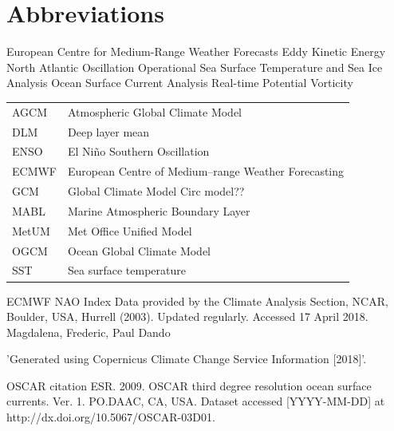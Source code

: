 


\section{Abbreviations}

\begin{acronyms}
	European Centre for Medium-Range Weather Forecasts
	Eddy Kinetic Energy
	North Atlantic Oscillation
	Operational Sea Surface Temperature and Sea Ice Analysis
	Ocean Surface Current Analysis Real-time
	Potential Vorticity
\end{acronyms}

\begin{tabular}{ l l }
	AGCM & Atmospheric Global Climate Model \\
	DLM & Deep layer mean \\ 
	ENSO & El Ni\~{n}o Southern Oscillation \\ 
	ECMWF & European Centre of Medium--range Weather Forecasting \\
	
	GCM & Global Climate Model Circ model?? \\
	MABL & Marine Atmospheric Boundary Layer \\
	MetUM & Met Office Unified Model \\
	OGCM & Ocean Global Climate Model \\
	SST & Sea surface temperature \\
	
	
\end{tabular}


\newpage





\acknowledgments
ECMWF
NAO Index Data provided by the Climate Analysis Section, NCAR, Boulder, USA, Hurrell (2003). Updated regularly. Accessed 17 April 2018.
Magdalena, Frederic, Paul Dando

'Generated using Copernicus Climate Change Service Information [2018]'.

OSCAR citation ESR. 2009. OSCAR third degree resolution ocean surface currents. Ver. 1. PO.DAAC,	CA,	USA. Dataset accessed [YYYY-MM-DD] at http://dx.doi.org/10.5067/OSCAR-03D01.
